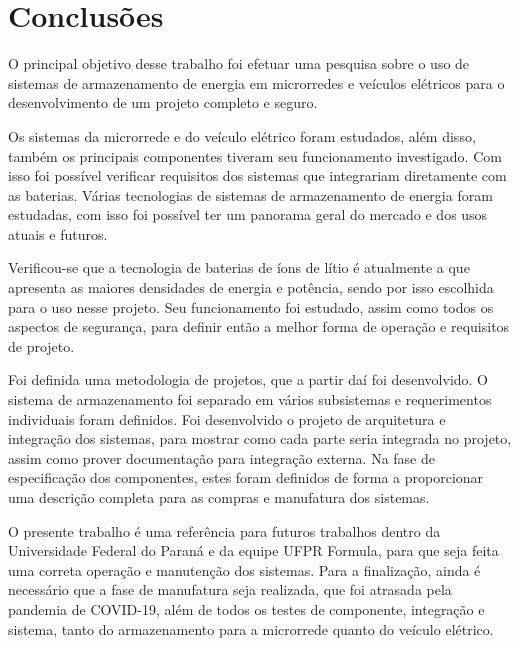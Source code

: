 \chapter{Conclusões}
\label{cap:exemplos}


O principal objetivo desse trabalho foi efetuar uma pesquisa sobre o uso de sistemas de armazenamento de energia em microrredes e veículos elétricos para o desenvolvimento de um projeto completo e seguro.

Os sistemas da microrrede e do veículo elétrico foram estudados, além disso, também os principais componentes tiveram seu funcionamento investigado. Com isso foi possível verificar requisitos dos sistemas que integrariam diretamente com as baterias. Várias tecnologias de sistemas de armazenamento de energia foram estudadas, com isso foi possível ter um panorama geral do mercado e dos usos atuais e futuros.

Verificou-se que a tecnologia de baterias de íons de lítio é atualmente a que apresenta as maiores densidades de energia e potência, sendo por isso escolhida para o uso nesse projeto. Seu funcionamento foi estudado, assim como todos os aspectos de segurança, para definir então a melhor forma de operação e requisitos de projeto.

Foi definida uma metodologia de projetos, que a partir daí foi desenvolvido. O sistema de armazenamento foi separado em vários subsistemas e requerimentos individuais foram definidos. Foi desenvolvido o projeto de arquitetura e integração dos sistemas, para mostrar como cada parte seria integrada no projeto, assim como prover documentação para integração externa. Na fase de especificação dos componentes, estes foram definidos de forma a proporcionar uma descrição completa para as compras e manufatura dos sistemas.

O presente trabalho é uma referência para futuros trabalhos dentro da Universidade Federal do Paraná e da equipe UFPR Formula, para que seja feita uma correta operação e manutenção dos sistemas. Para a finalização, ainda é necessário que a fase de manufatura seja realizada, que foi atrasada pela pandemia de COVID-19, além de todos os testes de componente, integração e sistema, tanto do armazenamento para a microrrede quanto do veículo elétrico.
